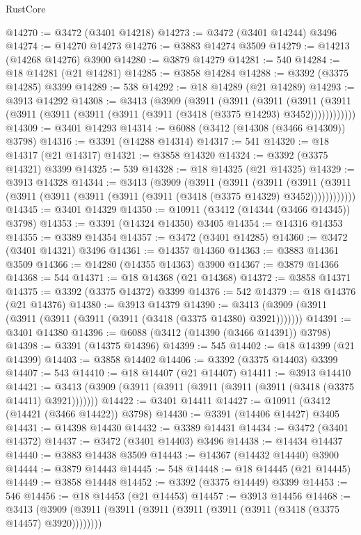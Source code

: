 \begin{lexlean}{RustCore}
\begin{coremodule}
@14270 := @3472 (@3401 @14218)
@14273 := @3472 (@3401 @14244) @3496
@14274 := @14270 @14273
@14276 := @3883 @14274 @3509
@14279 := @14213 (@14268 @14276) @3900
@14280 := @3879 @14279
@14281 := 540
@14284 := @18 @14281 (@21 @14281)
@14285 := @3858 @14284
@14288 := @3392 (@3375 @14285) @3399
@14289 := 538
@14292 := @18 @14289 (@21 @14289)
@14293 := @3913 @14292
@14308 := @3413
    (@3909
      (@3911
        (@3911
          (@3911
            (@3911 (@3911 (@3911 (@3911 (@3911 (@3911 (@3911 (@3418 (@3375 @14293) @3452))))))))))))
@14309 := @3401 @14293
@14314 := @6088 (@3412 (@14308 (@3466 @14309)) @3798)
@14316 := @3391 (@14288 @14314)
@14317 := 541
@14320 := @18 @14317 (@21 @14317)
@14321 := @3858 @14320
@14324 := @3392 (@3375 @14321) @3399
@14325 := 539
@14328 := @18 @14325 (@21 @14325)
@14329 := @3913 @14328
@14344 := @3413
    (@3909
      (@3911
        (@3911
          (@3911
            (@3911 (@3911 (@3911 (@3911 (@3911 (@3911 (@3911 (@3418 (@3375 @14329) @3452))))))))))))
@14345 := @3401 @14329
@14350 := @10911 (@3412 (@14344 (@3466 @14345)) @3798)
@14353 := @3391 (@14324 @14350) @3405
@14354 := @14316 @14353
@14355 := @3389 @14354
@14357 := @3472 (@3401 @14285)
@14360 := @3472 (@3401 @14321) @3496
@14361 := @14357 @14360
@14363 := @3883 @14361 @3509
@14366 := @14280 (@14355 @14363) @3900
@14367 := @3879 @14366
@14368 := 544
@14371 := @18 @14368 (@21 @14368)
@14372 := @3858 @14371
@14375 := @3392 (@3375 @14372) @3399
@14376 := 542
@14379 := @18 @14376 (@21 @14376)
@14380 := @3913 @14379
@14390 := @3413 (@3909 (@3911 (@3911 (@3911 (@3911 (@3911 (@3418 (@3375 @14380) @3921)))))))
@14391 := @3401 @14380
@14396 := @6088 (@3412 (@14390 (@3466 @14391)) @3798)
@14398 := @3391 (@14375 @14396)
@14399 := 545
@14402 := @18 @14399 (@21 @14399)
@14403 := @3858 @14402
@14406 := @3392 (@3375 @14403) @3399
@14407 := 543
@14410 := @18 @14407 (@21 @14407)
@14411 := @3913 @14410
@14421 := @3413 (@3909 (@3911 (@3911 (@3911 (@3911 (@3911 (@3418 (@3375 @14411) @3921)))))))
@14422 := @3401 @14411
@14427 := @10911 (@3412 (@14421 (@3466 @14422)) @3798)
@14430 := @3391 (@14406 @14427) @3405
@14431 := @14398 @14430
@14432 := @3389 @14431
@14434 := @3472 (@3401 @14372)
@14437 := @3472 (@3401 @14403) @3496
@14438 := @14434 @14437
@14440 := @3883 @14438 @3509
@14443 := @14367 (@14432 @14440) @3900
@14444 := @3879 @14443
@14445 := 548
@14448 := @18 @14445 (@21 @14445)
@14449 := @3858 @14448
@14452 := @3392 (@3375 @14449) @3399
@14453 := 546
@14456 := @18 @14453 (@21 @14453)
@14457 := @3913 @14456
@14468 := @3413 (@3909 (@3911 (@3911 (@3911 (@3911 (@3911 (@3911 (@3418 (@3375 @14457) @3920))))))))

\end{coremodule}
\end{lexlean}
